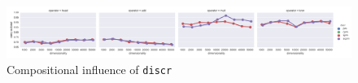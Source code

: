 \begin{figure}[b]
  \centering

  \includegraphics[width=1.1\textwidth]{supplement/figures/compositional-interaction-discr}

  \caption{Compositional influence of \texttt{discr}}
  \label{fig:compositional-discr}
\end{figure}
